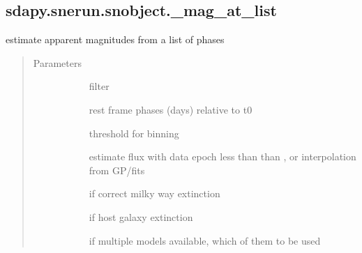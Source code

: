 \documentclass[letterpaper,10pt,english]{sphinxmanual}
\begin{document}
\subsection{sdapy.snerun.snobject.\_mag\_at\_list}
\label{\detokenize{generated/sdapy.snerun.snobject._mag_at_list:sdapy-snerun-snobject-mag-at-list}}\label{\detokenize{generated/sdapy.snerun.snobject._mag_at_list::doc}}

\begin{fulllineitems}
\label{\detokenize{generated/sdapy.snerun.snobject._mag_at_list:sdapy.snerun.snobject._mag_at_list}}
estimate apparent magnitudes from a list of phases
\begin{quote}\begin{description}
\item[{Parameters}] \leavevmode\begin{description}
\item[{}] \leavevmode{[}\sphinxtitleref{str}{]}
filter

\item[{}] \leavevmode{[}\sphinxtitleref{list}{]}
rest frame phases (days) relative to t0

\item[{}] \leavevmode{[}\sphinxtitleref{float}{]}
threshold for binning

\item[{}] \leavevmode{[}\sphinxtitleref{str}{]}
estimate flux with data epoch less than than , or interpolation from GP/fits

\item[{}] \leavevmode{[}\sphinxtitleref{bool}{]}
if correct milky way extinction

\item[{}] \leavevmode{[}\sphinxtitleref{bool}{]}
if host galaxy extinction

\item[{}] \leavevmode{[}\sphinxtitleref{int}{]}
if multiple models available, which of them to be used


\end{description}
\end{description}
\end{quote}
\end{fulllineitems}
\end{document}
